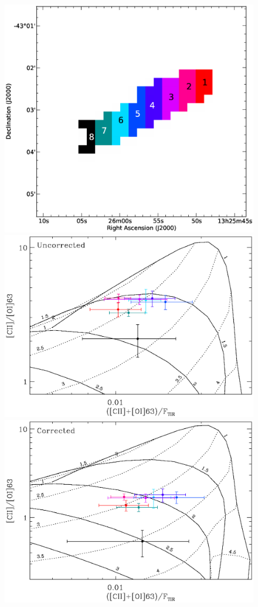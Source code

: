 \documentclass[preprint2]{aastex}
\begin{document}
\begin{figure}
\includegraphics[width=\columnwidth]{CenA_colour_guide_cropped}
\includegraphics[width=\columnwidth]{CenA_CIIOI63_vs_CIIOI63onFtir_uncorrected_plot_radial_bins_v2}
\includegraphics[width=\columnwidth]{CenA_CIIOI63_vs_CIIOI63onFtir_corrected_plot_radial_bins_v2}

\end{figure}
\end{document}
